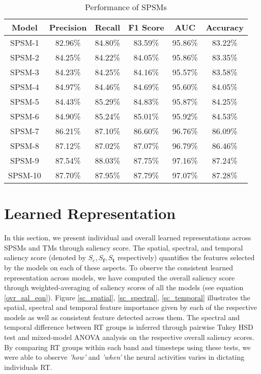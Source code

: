 \documentclass{article}
\begin{document}
\begin{table*}[h!tb]
        \centering
        \caption{Performance of SPSMs}
        \begin{tabular}{c | c | c | c | c | c}
        \textbf{Model} & \textbf{Precision} & \textbf{Recall} & \textbf{F1 Score} & \textbf{AUC} & \textbf{Accuracy} \\
        \hline
        SPSM-1 & 82.96\% & 84.80\% & 83.59\% & 95.86\% & 83.22\% \\
        SPSM-2 & 84.25\% & 84.22\% & 84.05\% & 95.86\% & 83.35\% \\
        SPSM-3 & 84.23\% & 84.25\% & 84.16\% & 95.57\% & 83.58\% \\
        SPSM-4 & 84.97\% & 84.46\% & 84.69\% & 95.60\% & 84.05\% \\
        SPSM-5 & 84.43\% & 85.29\% & 84.83\% & 95.87\% & 84.25\% \\
        SPSM-6 & 84.90\% & 85.24\% & 85.01\% & 95.92\% & 84.53\% \\
        SPSM-7 & 86.21\% & 87.10\% & 86.60\% & 96.76\% & 86.09\% \\
        SPSM-8 & 87.12\% & 87.02\% & 87.07\% & 96.79\% & 86.46\% \\
        SPSM-9 & 87.54\% & 88.03\% & 87.75\% & 97.16\% & 87.24\% \\
        SPSM-10 & 87.70\% & 87.95\% & 87.79\% & 97.07\% & 87.28\% \\
       \end{tabular}
    \end{table*}
\section{Learned Representation}
In this section, we present individual and overall learned representations across SPSMs and TMs through saliency score. The spatial, spectral, and temporal saliency score (denoted by $S_e, S_\mathbf{f}, S_\mathbf{t}$ respectively) quantifies the features selected by the models on each of these aspects. To observe the consistent learned representation across models, we have computed the overall saliency score through weighted-averaging of saliency scores of all the models (see equation \ref{ovr_sal_eqn}). Figure \ref{sc_spatial}, \ref{sc_spectral}, \ref{sc_temporal} illustrates the spatial, spectral and temporal feature importance given by each of the respective models as well as consistent feature detected across them. The spectral and temporal difference between RT groups is inferred through pairwise Tukey HSD test and mixed-model ANOVA analysis on the respective overall saliency scores. By comparing RT groups within each band and timesteps using these tests, we were able to observe \emph{'how'} and \emph{'when'} the neural activities varies in dictating individuals RT.
\end{document}
